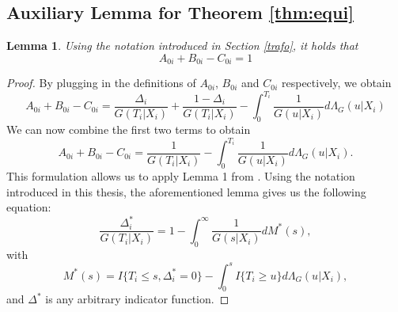 \documentclass[12pt, a4paper]{scrartcl}
\theoremstyle{definition}
\theoremstyle{plain}
\newtheorem{Lemma}{Lemma}[section]
\numberwithin{equation}{section}
\numberwithin{figure}{section}
\numberwithin{table}{section}
\begin{document}
\begin{appendices}
		\subsection{Auxiliary Lemma for Theorem \ref{thm:equi}}\label{proof:strawderman}
		
		\begin{Lemma}\label{lem:equi}
			Using the notation introduced in Section \ref{trafo}, it holds that 
			\begin{equation*}
				A_{0i}+B_{0i}-C_{0i}=1
			\end{equation*}
		\end{Lemma}
		\begin{proof}
			By plugging in the definitions of $A_{0i}$, $B_{0i}$ and $C_{0i}$ respectively, we obtain
			\begin{equation*}
			A_{0i}+B_{0i}-C_{0i} = \frac{\Delta_i}{G(T_i\vert X_i)} + \frac{1-\Delta_i}{G(T_i\vert X_i)} - \int_{0}^{T_i}\frac{1}{G(u\vert X_i)}d\Lambda_G(u\vert X_i)
			\end{equation*}
			We can now combine the first two terms to obtain
			\begin{equation}\label{eq:lemma}
			A_{0i}+B_{0i}-C_{0i} = \frac{1}{G(T_i \vert X_i)} - \int_{0}^{T_i}\frac{1}{G(u\vert X_i)}d\Lambda_G(u\vert X_i).
			\end{equation}
			This formulation allows us to apply Lemma 1 from \citet*{strawderman}.
			Using the notation introduced in this thesis, the aforementioned lemma gives us the following equation:
			\begin{equation}\label{eq:straw}
			\frac{\Delta^*_i}{G(T_i\vert X_i)} = 1 - \int_{0}^{\infty} \frac{1}{G(s\vert X_i)} dM^*(s),
			\end{equation}
			with
			\begin{equation*}
			M^*(s) = I\{T_i \leq s, \Delta^*_i=0\} - \int_{0}^s I\{T_i\geq u\}d\Lambda_G(u\vert X_i),
			\end{equation*}
			and $\Delta^*$ is any arbitrary indicator function.
			

\end{proof}
\end{appendices}
\end{document}
